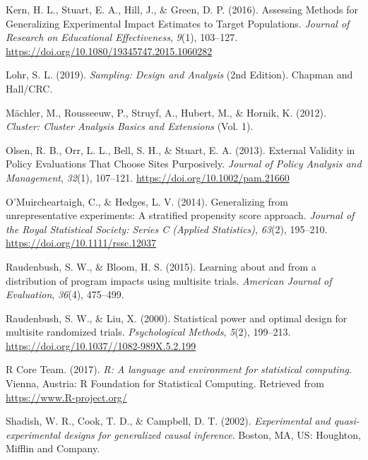\documentclass[english,man,floatsintext]{apa6}
\begin{document}
\leavevmode\hypertarget{ref-kernAssessingMethodsGeneralizing2016}{}%
Kern, H. L., Stuart, E. A., Hill, J., \& Green, D. P. (2016). Assessing Methods for Generalizing Experimental Impact Estimates to Target Populations. \emph{Journal of Research on Educational Effectiveness}, \emph{9}(1), 103--127. \url{https://doi.org/10.1080/19345747.2015.1060282}

\leavevmode\hypertarget{ref-lohrSamplingDesignAnalysis2019}{}%
Lohr, S. L. (2019). \emph{Sampling: Design and Analysis} (2nd Edition). Chapman and Hall/CRC.

\leavevmode\hypertarget{ref-machlerClusterClusterAnalysis2012}{}%
Mächler, M., Rousseeuw, P., Struyf, A., Hubert, M., \& Hornik, K. (2012). \emph{Cluster: Cluster Analysis Basics and Extensions} (Vol. 1).

\leavevmode\hypertarget{ref-olsenExternalValidityPolicy2013}{}%
Olsen, R. B., Orr, L. L., Bell, S. H., \& Stuart, E. A. (2013). External Validity in Policy Evaluations That Choose Sites Purposively. \emph{Journal of Policy Analysis and Management}, \emph{32}(1), 107--121. \url{https://doi.org/10.1002/pam.21660}

\leavevmode\hypertarget{ref-omuircheartaighGeneralizingUnrepresentativeExperiments2014}{}%
O'Muircheartaigh, C., \& Hedges, L. V. (2014). Generalizing from unrepresentative experiments: A stratified propensity score approach. \emph{Journal of the Royal Statistical Society: Series C (Applied Statistics)}, \emph{63}(2), 195--210. \url{https://doi.org/10.1111/rssc.12037}

\leavevmode\hypertarget{ref-raudenbush2015learning}{}%
Raudenbush, S. W., \& Bloom, H. S. (2015). Learning about and from a distribution of program impacts using multisite trials. \emph{American Journal of Evaluation}, \emph{36}(4), 475--499.

\leavevmode\hypertarget{ref-raudenbushStatisticalPowerOptimal2000}{}%
Raudenbush, S. W., \& Liu, X. (2000). Statistical power and optimal design for multisite randomized trials. \emph{Psychological Methods}, \emph{5}(2), 199--213. \url{https://doi.org/10.1037//1082-989X.5.2.199}

\leavevmode\hypertarget{ref-rcite}{}%
R Core Team. (2017). \emph{R: A language and environment for statistical computing}. Vienna, Austria: R Foundation for Statistical Computing. Retrieved from \url{https://www.R-project.org/}

\leavevmode\hypertarget{ref-shadishExperimentalQuasiexperimentalDesigns2002}{}%
Shadish, W. R., Cook, T. D., \& Campbell, D. T. (2002). \emph{Experimental and quasi-experimental designs for generalized causal inference}. Boston, MA, US: Houghton, Mifflin and Company.
\end{document}
